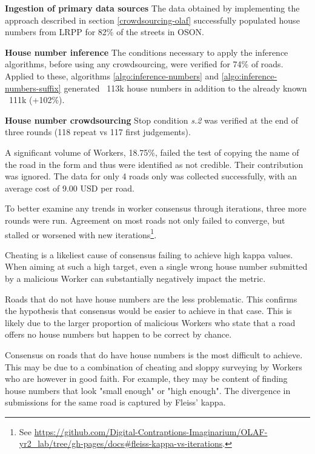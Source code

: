 \textbf{Ingestion of primary data sources} The data obtained by implementing the approach described in section \ref{crowdsourcing-olaf} successfully populated house numbers from LRPP for 82\% of the streets in OSON.

\textbf{House number inference} The conditions necessary to apply the inference algorithms, before using any crowdsourcing, were verified for 74\% of roads. Applied to these, algorithms \ref{algo:inference-numbers} and \ref{algo:inference-numbers-suffix} generated ~113k house numbers in addition to the already known ~111k (+102\%). 

\textbf{House number crowdsourcing} Stop condition {\it s.2} was verified at the end of three rounds (118 repeat vs 117 first judgements). 

A significant volume of Workers, 18.75\%, failed the test of copying the name of the road in the form and thus were identified as not credible. Their contribution was ignored. The data for only 4 roads only was collected successfully, with an average cost of 9.00 USD per road.

To better examine any trends in worker consensus through iterations, three more rounds were run. Agreement on most roads not only failed to converge, but stalled or worsened with new iterations\footnote{See \url{https://github.com/Digital-Contraptions-Imaginarium/OLAF-yr2_lab/tree/gh-pages/docs#fleiss-kappa-vs-iterations}.}. 

Cheating is a likeliest cause of consensus failing to achieve high kappa values. When aiming at such a high target, even a single wrong house number submitted by a malicious Worker can substantially negatively impact the metric.

Roads that do not have house numbers are the less problematic. This confirms the hypothesis that consensus would be easier to achieve in that case. This is likely due to the larger proportion of malicious Workers who state that a road offers no house numbers but happen to be correct by chance.

Consensus on roads that do have house numbers is the most difficult to achieve. This may be due to a combination of cheating and sloppy surveying by Workers who are however in good faith. For example, they may be content of finding house numbers that look "small enough" or "high enough". The divergence in submissions for the same road is captured by Fleiss' kappa.